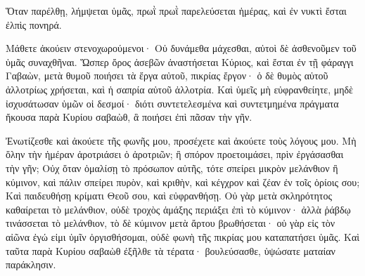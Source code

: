 {Ὅταν παρέλθῃ, λήμψεται ὑμᾶς, πρωῒ πρωῒ παρελεύσεται ἡμέρας, καὶ ἐν νυκτὶ ἔσται ἐλπὶς πονηρά.
\par }{\PP {}Μάθετε ἀκούειν στενοχωρούμενοι· Οὐ δυνάμεθα μάχεσθαι, αὐτοὶ δὲ ἀσθενοῦμεν τοῦ ὑμᾶς συναχθῆναι.
Ὥσπερ ὄρος ἀσεβῶν ἀναστήσεται Κύριος, καὶ ἔσται ἐν τῇ φάραγγι Γαβαὼν, μετὰ θυμοῦ ποιήσει τὰ ἔργα αὐτοῦ, πικρίας ἔργον· ὁ δὲ θυμὸς αὐτοῦ ἀλλοτρίως χρήσεται, καὶ ἡ σαπρία αὐτοῦ ἀλλοτρία.
Καὶ ὑμεῖς μὴ εὐφρανθείητε, μηδὲ ἰσχυσάτωσαν ὑμῶν οἱ δεσμοί· διότι συντετελεσμένα καὶ συντετμημένα πράγματα ἤκουσα παρὰ Κυρίου σαβαὼθ, ἃ ποιήσει ἐπὶ πᾶσαν τὴν γῆν.
\par }{\PP {}Ἐνωτίζεσθε καὶ ἀκούετε τῆς φωνῆς μου, προσέχετε καὶ ἀκούετε τοὺς λόγους μου.
Μὴ ὅλην τὴν ἡμέραν ἀροτριάσει ὁ ἀροτριῶν; ἢ σπόρον προετοιμάσει, πρὶν ἐργάσασθαι τὴν γῆν;
Οὐχ ὅταν ὁμαλίσῃ τὸ πρόσωπον αὐτῆς, τότε σπείρει μικρὸν μελάνθιον ἢ κύμινον, καὶ πάλιν σπείρει πυρὸν, καὶ κριθὴν, καὶ κέγχρον καὶ ζέαν ἐν τοῖς ὁρίοις σου;
Καὶ παιδευθήσῃ κρίματι Θεοῦ σου, καὶ εὐφρανθήσῃ.
Οὐ γὰρ μετὰ σκληρότητος καθαίρεται τὸ μελάνθιον, οὐδὲ τροχὸς ἁμάξης περιάξει ἐπὶ τὸ κύμινον· ἀλλὰ ῥάβδῳ τινάσσεται τὸ μελάνθιον, τὸ δὲ κύμινον
μετὰ ἄρτου βρωθήσεται· οὐ γὰρ εἰς τὸν αἰῶνα ἐγώ εἰμι ὑμῖν ὀργισθήσομαι, οὐδὲ φωνὴ τῆς πικρίας μου καταπατήσει ὑμᾶς.
Καὶ ταῦτα παρὰ Κυρίου σαβαὼθ ἐξῆλθε τὰ τέρατα· βουλεύσασθε, ὑψώσατε ματαίαν παράκλησιν.

}

